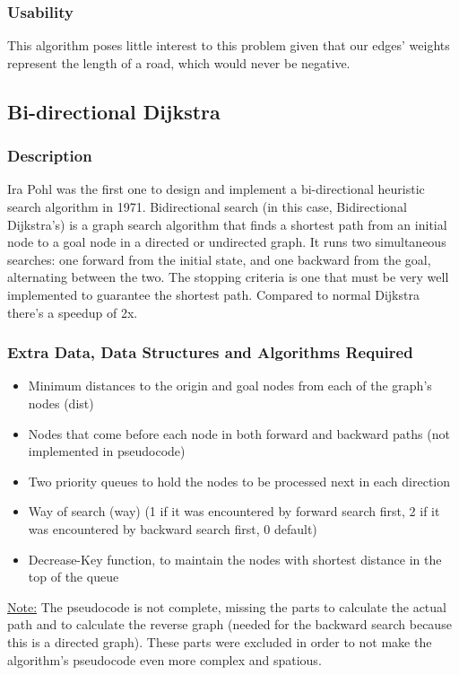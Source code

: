 \subsubsection{Usability}
This algorithm poses little interest to this problem given that our edges' weights represent the length of a road, which would never be negative. 


\subsection{Bi-directional Dijkstra}

\subsubsection{Description}
Ira Pohl was the first one to design and implement a bi-directional heuristic search algorithm in 1971. 
Bidirectional search (in this case, Bidirectional Dijkstra's) is a graph search algorithm that finds a shortest path from an initial node to a goal node in a directed or undirected graph. It runs two simultaneous searches: one forward from the initial state, and one backward from the goal, alternating between the two. The stopping criteria is one that must be very well implemented to guarantee the shortest path. Compared to normal Dijkstra there's a speedup of 2x.

\subsubsection{Extra Data, Data Structures and Algorithms Required}
\begin{itemize}
    \item Minimum distances to the origin and goal nodes from each of the graph's nodes (dist)
    \item Nodes that come before each node in both forward and backward paths (not implemented in pseudocode)
    \item Two priority queues to hold the nodes to be processed next in each direction
    \item Way of search (way) (1 if it was encountered by forward search first, 2 if it was encountered by backward search first, 0 default)
    \item Decrease-Key function, to maintain the nodes with shortest distance in the top of the queue
\end{itemize}


\uline{Note:} The pseudocode is not complete, missing the parts to calculate the actual path and to calculate the reverse graph (needed for the backward search because this is a directed graph). These parts were excluded in order to not make the algorithm's pseudocode even more complex and spatious.

